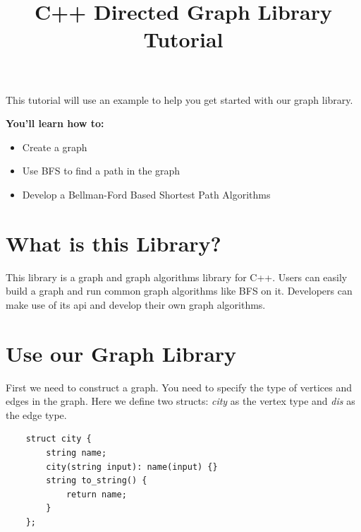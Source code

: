\documentclass{article}
\title{C++ Directed Graph Library Tutorial}
\author{}
\begin{document}
    \maketitle

    \tableofcontents
    \newpage
    This tutorial will use an example to help you get started with our graph library. 
    
    \textbf{You'll learn how to:}
    \begin{itemize}
    	\item Create a graph
    	\item Use BFS to find a path in the graph
    	\item Develop a Bellman-Ford Based Shortest Path Algorithms
    \end{itemize}

	\section{What is this Library?}
	This library is a graph and graph algorithms library for C++. Users can easily build a graph and run common graph algorithms like BFS on it. Developers can make use of its api and develop their own graph algorithms. 

    \section {Use our Graph Library}
    First we need to construct a graph. You need to specify the type of vertices and edges in the graph. Here we define two structs: \textit{city} as the vertex type and \textit{dis} as the edge type.
    \begin{lstlisting}
    struct city {
	    string name;
	    city(string input): name(input) {} 
	    string to_string() {
	    	return name;
	    }
    };
    \end{lstlisting}
    
\end{document}
